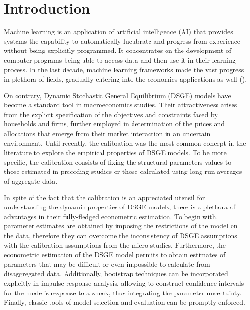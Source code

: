 \documentclass{pracamgr}
\numberwithin{equation}{section}
\begin{document}
\tableofcontents
\listoffigures
\listoftables
\listofalgorithms


\chapter*{Introduction} \label{Introduction}

Machine learning is an application of artificial intelligence (AI) that provides systems the capability to automatically lucubrate and progress from experience without being explicitly programmed. It concentrates on the development of computer programs being able to access data and then use it in their learning process. In the last decade, machine learning frameworks made the vast progress in plethora of fields, gradually entering into the economics applications as well (\citet{mullainathan2017machine}). 

On contrary, Dynamic Stochastic General Equilibrium (DSGE) models have become a standard tool in macroeconomics studies. Their attractiveness arises from the explicit specification of the objectives and constraints faced by households and firms, further employed in determination of the prices and allocations that emerge from their market interaction in an uncertain environment. Until recently, the calibration was the most common concept in the literature to explore the empirical properties of DSGE models. To be more specific, the calibration consists of fixing the structural parameters values to those estimated in preceding studies or those calculated using long-run averages of aggregate data. 

In spite of the fact that the calibration is an appreciated utensil for understanding the dynamic properties of DSGE models, there is a plethora of advantages in their fully-fledged econometric estimation. To begin with, parameter estimates are obtained by imposing the restrictions of the model on the data, therefore they can overcome the inconsistency of DSGE assumptions with the calibration assumptions from the micro studies. Furthermore, the econometric estimation of the DSGE model permits to obtain estimates of parameters that may be difficult or even impossible to calculate from disaggregated data. Additionally, bootstrap techniques can be incorporated explicitly in impulse-response analysis, allowing to construct confidence intervals for the model’s response to a shock, thus integrating the parameter uncertainty. Finally, classic tools of model selection and evaluation can be promptly enforced.
\end{document}
